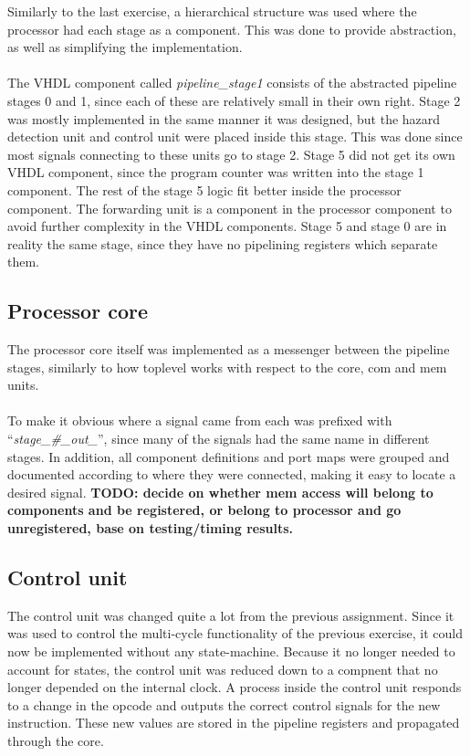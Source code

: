 Similarly to the last exercise, a hierarchical structure was used where the
processor had each stage as a component. This was done to provide abstraction,
as well as simplifying the implementation.
\paragraph*{}
The VHDL component called \emph{pipeline\_stage1} consists of the abstracted
pipeline stages 0 and 1, since each of these are relatively small in their own
right. Stage 2 was mostly implemented in the same manner it was designed, but the hazard
detection unit and control unit were placed inside this stage. This was done
since most signals connecting to these units go to stage 2. Stage 5 did not get
its own VHDL component, since the program counter was written into the stage 1
component.
The rest of the stage 5 logic fit better inside the processor
component. The forwarding unit is a component in the processor component to
avoid further complexity in the VHDL components.  Stage 5 and stage 0 are in reality the same stage, since they have no pipelining registers which separate them.

\subsection{Processor core}
The processor core itself was implemented as a messenger between the pipeline
stages, similarly to how toplevel works with respect to the core, com and mem
units.
\paragraph*{}
To make it obvious where a signal came from each was prefixed with
``\emph{stage\_\#\_out\_}'', since many of the signals had the same name in
different stages. In addition, all component definitions and port maps were
grouped and documented according to where they were connected, making it easy to
locate a desired signal.\newline
\textbf{TODO: decide on whether mem access will belong to components and be registered, or belong to processor and go unregistered, base on testing/timing results.}

\subsection{Control unit}
The control unit was changed quite a lot from the previous assignment. Since it was used to control the multi-cycle functionality of the previous exercise, it could now be implemented without any state-machine. Because it no longer needed to account for states, the control unit was reduced down to a compnent that no longer depended on the internal clock. A process inside the control unit responds to a change in the opcode and outputs the correct control signals for the new instruction. These new values are stored in the pipeline registers and propagated through the core. 
